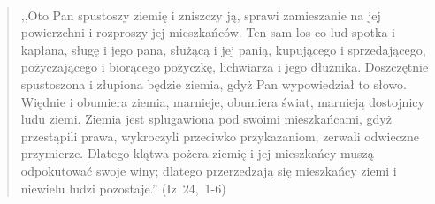 \documentclass[10pt,a4paper,oneside]{article}
\begin{document}
\paragraph{}
\begin{quote}
,,Oto Pan spustoszy ziemię i zniszczy ją, sprawi zamieszanie na jej powierzchni i rozproszy jej mieszkańców. Ten sam los co lud spotka i kapłana, sługę i jego pana, służącą i jej panią, kupującego i sprzedającego, pożyczającego i biorącego pożyczkę, lichwiarza i jego dłużnika. Doszczętnie spustoszona i złupiona będzie ziemia, gdyż Pan wypowiedział to słowo. Więdnie i obumiera ziemia, marnieje, obumiera świat, marnieją dostojnicy ludu ziemi. Ziemia jest splugawiona pod swoimi mieszkańcami, gdyż przestąpili prawa, wykroczyli przeciwko przykazaniom, zerwali odwieczne przymierze. Dlatego klątwa pożera ziemię i jej mieszkańcy muszą odpokutować swoje winy; dlatego przerzedzają się mieszkańcy ziemi i niewielu ludzi pozostaje.'' \mbox{(Iz 24, 1-6)}
\end{quote}
\end{document}
